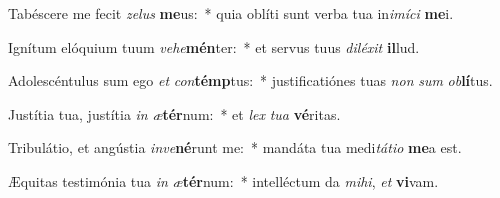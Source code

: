 \item Tabéscere me fecit \textit{ze}\textit{lus} \textbf{me}us:~* quia oblíti sunt verba tua in\textit{i}\textit{mí}\textit{ci} \textbf{me}i.
\item Ignítum elóquium tuum \textit{ve}\textit{he}\textbf{mén}ter:~* et servus tuus \textit{di}\textit{lé}\textit{xit} \textbf{il}lud.
\item Adolescéntulus sum ego \textit{et} \textit{con}\textbf{témp}tus:~* justificatiónes tuas \textit{non} \textit{sum} \textit{ob}\textbf{lí}tus.
\item Justítia tua, justítia \textit{in} \textit{æ}\textbf{tér}num:~* et \textit{lex} \textit{tu}\textit{a} \textbf{vé}ritas.
\item Tribulátio, et angústia \textit{in}\textit{ve}\textbf{né}runt me:~* mandáta tua medi\textit{tá}\textit{ti}\textit{o} \textbf{me}a est.
\item Æquitas testimónia tua \textit{in} \textit{æ}\textbf{tér}num:~* intelléctum da \textit{mi}\textit{hi}, \textit{et} \textbf{vi}vam.
